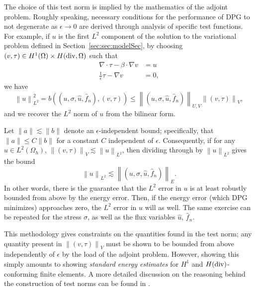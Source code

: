 \documentclass[11pt,onecolumn]{scrartcl}
\newcommand{\secref}[1]{\ref{sec:#1}}
\newcommand{\nor}[1]{\left\| #1 \right\|}
\newcommand{\Oh}{\Omega_h}
\newcommand{\grad}{\nabla}
\renewcommand{\div}{\grad \cdot}
\begin{document}
The choice of this test norm is implied by the mathematics of the adjoint problem. Roughly speaking, necessary conditions for the performance of DPG to not degenerate as $\epsilon \rightarrow 0$ are derived through analysis of specific test functions. For example, if $u$ is the first $L^2$ component of the solution to the variational problem defined in Section~\secref{sec:modelSec}, by choosing $(v,\tau) \in H^1(\Omega) \times H({\rm div},\Omega)$ such that 
\begin{align*}
\div \tau - \beta \cdot \grad v &= u \\
\frac{1}{\epsilon} \tau - \grad v &= 0,
\end{align*}
we have
\[
 \nor{u}_{L^2}^2 = b\left(\left(u,\sigma,\widehat{u},\widehat{f}_n\right),\left(v,\tau\right)\right) \leq \nor{\left(u,\sigma,\widehat{u},\widehat{f}_n\right)}_{U,V} \nor{\left(v,\tau\right)}_V,
\]
and we recover the $L^2$ norm of $u$ from the bilinear form.

Let $\|a\| \lesssim \|b\|$ denote an $\epsilon$-independent bound; specifically, that $\|a\| \leq C\|b\|$ for a constant $C$ independent of $\epsilon$. Consequently, if for any $u\in L^2(\Oh)$, $\nor{\left(v,\tau\right)}_V\lesssim \nor{u}_{L^2}$, then dividing through by $\nor{u}_{L^2}$ gives the bound
\[
 \nor{u}_{L^2} \lesssim \nor{\left(u,\sigma,\widehat{u},\widehat{f}_n\right)}_E.
\]
In other words, there is the guarantee that the $L^2$ error in $u$ is at least robustly bounded from above by the energy error. Then, if the energy error (which DPG minimizes) approaches zero, the $L^2$ error in $u$ will as well. The same exercise can be repeated for the stress $\sigma$, as well as the flux variables $\widehat{u}$, $\widehat{f}_n$. 

This methodology gives constraints on the quantities found in the test norm; any quantity present in $\nor{\left(v,\tau\right)}_V$ must be shown to be bounded from above independently of $\epsilon$ by the load of the adjoint problem. However, showing this simply amounts to showing \textit{standard energy estimates} for $H^1$ and $H({\rm div})$-conforming finite elements. A more detailed discussion on the reasoning behind the construction of test norms can be found in \cite{DPGrobustness}. 
\end{document}
